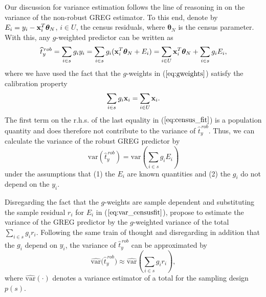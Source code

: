 \documentclass[a4paper,oneside,11pt,DIV=12]{scrartcl}
\theoremstyle{remark}
\begin{document}
\noindent Our discussion for variance estimation follows the line of reasoning
in \citet[][p. 233--234]{sarndal_swensson_etal_1992} on the variance of the
non-robust GREG estimator. To this end, denote by $E_i = y_i - \bold x_i^T
\boldsymbol \theta_N$, $i \in U$, the census residuals, where $\boldsymbol
\theta_N$ is the census parameter. With this, any $g$-weighted predictor can be
written as
\begin{equation}\label{eq:census_fit}
    \widehat{t}_y^{\,rob} = \sum_{i \in s} g_i y_i = \sum_{i \in s} g_i (\bold
    x_i^T \boldsymbol \theta_N + E_i) = \sum_{i \in U} \bold x_i^T \boldsymbol
    \theta_N + \sum_{i \in s} g_i E_i,
\end{equation}
\noindent where we have used the fact that the $g$-weights in
($\ref{eq:gweights}$) satisfy the calibration property
\begin{equation*}
	\sum_{i \in s} g_i \bold x_i = \sum_{i \in U} \bold x_i.
\end{equation*}
\noindent The first term on the r.h.s. of the last equality in
($\ref{eq:census_fit}$) is a population quantity and does therefore not
contribute to the variance of $\widehat{t}_y^{\,rob}$. Thus, we can calculate
the variance of the robust GREG predictor by
\begin{equation}\label{eq:var_censusfit}
    \mathrm{var}\left(\widehat{t}_y^{\,rob}\right) = \mathrm{var}\left(\sum_{i
    \in s} g_i E_i\right)
\end{equation}
\noindent under the assumptions that (1) the $E_i$ are known quantities and (2)
the $g_i$ do not depend on the $y_i$.

Disregarding the fact that the $g$-weights are sample dependent and
substituting the sample residual $r_i$ for $E_i$ in ($\ref{eq:var_censusfit}$),
\citet[][p. 233-234 and Result 6.6.1]{sarndal_swensson_etal_1992} propose to
estimate the variance of the GREG predictor by the $g$-weighted variance of the
total $\sum_{i \in s}g_ir_i$. Following the same train of thought and
disregarding in addition that the $g_i$ depend on $y_i$, the variance of
$\widehat{t}_y^{\,rob}$ can be approximated by
\begin{equation*}
    \widehat{\mathrm{var}}\big(\widehat{t}_y^{\,rob}\big) \approx
    \widehat{\mathrm{var}}\left(\sum_{i \in s}g_i r_i\right),
\end{equation*}
\noindent where $\widehat{\mathrm{var}}(\cdot)$ denotes a variance estimator of
a total for the sampling design $p(s)$.

\clearpage


\end{document}
